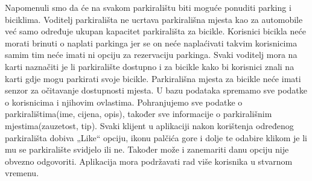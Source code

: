 Napomenuli smo da će na svakom parkiralištu biti moguće ponuditi parking i biciklima. Voditelj parkirališta ne ucrtava parkirališna mjesta kao za automobile već samo određuje ukupan kapacitet parkirališta za bicikle. Korisnici bicikla neće morati brinuti o naplati parkinga jer se on neće naplaćivati takvim korisnicima samim tim neće imati ni opciju za rezervaciju parkinga. Svaki voditelj mora na karti naznačiti je li parkiralište dostupno i za bicikle kako bi korisnici znali na karti gdje mogu parkirati svoje bicikle. Parkirališna mjesta za bicikle neće imati senzor za očitavanje dostupnosti mjesta. U bazu podataka spremamo sve podatke o korisnicima i njihovim ovlastima. Pohranjujemo sve podatke o parkiralištima(ime, cijena, opis), također sve informacije o parkirališnim mjestima(zauzetost, tip). Svaki klijent u aplikaciji nakon korištenja određenog parkirališta dobiva „Like“ opciju, ikonu palčića gore  i dolje te odabire klikom je li mu se parkiralište svidjelo ili ne. Također može i zanemariti danu opciju nije obvezno odgovoriti. Aplikacija mora podržavati rad više korisnika u stvarnom vremenu.


		\eject
		


		

